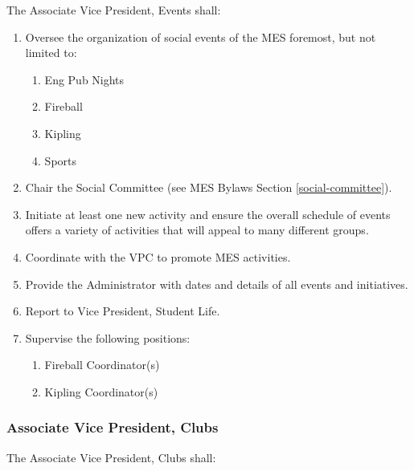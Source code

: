 The Associate Vice President, Events shall:

\begin{enumerate}
 \item
  Oversee the organization of social events of the MES foremost, but not
  limited to:

  \begin{enumerate}
   \item
    Eng Pub Nights
   \item
    Fireball
   \item
    Kipling
   \item
    Sports
  \end{enumerate}
 \item
  Chair the Social Committee (see MES Bylaws Section \ref{social-committee}).
 \item
  Initiate at least one new activity and ensure the overall schedule of
  events offers a variety of activities that will appeal to many
  different groups.
 \item
  Coordinate with the VPC to promote MES activities.
 \item
  Provide the Administrator with dates and details of all events and
  initiatives.
 \item
  Report to Vice President, Student Life.
 \item
  Supervise the following positions:

  \begin{enumerate}
   \item
    Fireball Coordinator(s)
   \item
    Kipling Coordinator(s)

  \end{enumerate}
\end{enumerate}

\hypertarget{associate-vice-president-clubs}{%
 \subsubsection{Associate Vice President,
  Clubs}
 \label{associate-vice-president-clubs}}
The Associate Vice President, Clubs shall:

